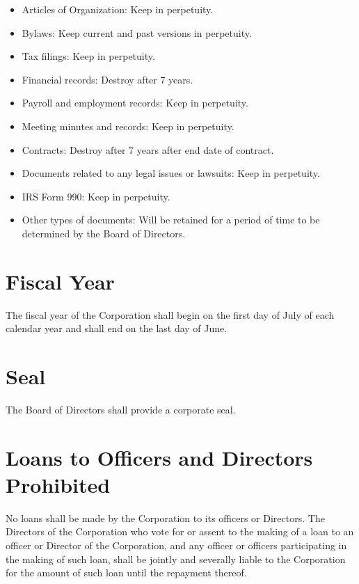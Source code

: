 \documentclass[12pt]{report}
\begin{document}
\begin{itemize}

\item Articles of Organization: Keep in perpetuity.
\item Bylaws: Keep current and past versions in perpetuity.
\item Tax filings: Keep in perpetuity.
\item Financial records: Destroy after 7 years.
\item Payroll and employment records: Keep in perpetuity.
\item Meeting minutes and records: Keep in perpetuity.
\item Contracts: Destroy after 7 years after end date of contract.
\item Documents related to any legal issues or lawsuits: Keep in perpetuity.
\item IRS Form 990: Keep in perpetuity.
\item Other types of documents: Will be retained for a period of time to be determined by the Board of Directors.

\end{itemize}

\section{Fiscal Year}

The fiscal year of the Corporation shall begin on the first day of July of each calendar year and shall end on the last day of June.

\section{Seal}

The Board of Directors shall provide a corporate seal.

\section{Loans to Officers and Directors Prohibited}

No loans shall be made by the Corporation to its officers or Directors. The Directors of the Corporation who vote for or assent to the making of a loan to an officer or Director of the Corporation, and any officer or officers participating in the making of such loan, shall be jointly and severally liable to the Corporation for the amount of such loan until the repayment thereof.
\end{document}
